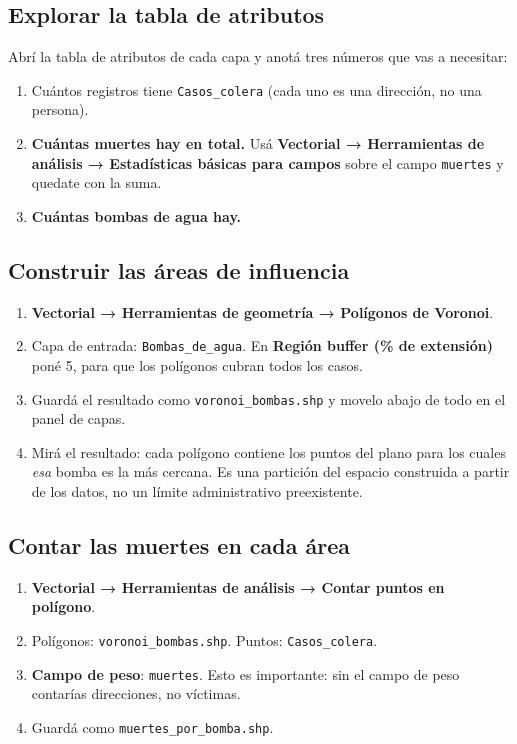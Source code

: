 \documentclass{article}
\begin{document}
\subsection{Explorar la tabla de atributos}

Abrí la tabla de atributos de cada capa y anotá tres números que vas a necesitar:

\begin{enumerate}
    \item Cuántos registros tiene \texttt{Casos\_colera} (cada uno es una dirección, no una persona).
    \item \textbf{Cuántas muertes hay en total.} Usá \textbf{Vectorial → Herramientas de análisis → Estadísticas básicas para campos} sobre el campo \texttt{muertes} y quedate con la suma.
    \item \textbf{Cuántas bombas de agua hay.}
\end{enumerate}

\subsection{Construir las áreas de influencia}

\begin{enumerate}
    \item \textbf{Vectorial → Herramientas de geometría → Polígonos de Voronoi}.
    \item Capa de entrada: \texttt{Bombas\_de\_agua}. En \textbf{Región buffer (\% de extensión)} poné 5, para que los polígonos cubran todos los casos.
    \item Guardá el resultado como \texttt{voronoi\_bombas.shp} y movelo abajo de todo en el panel de capas.
    \item Mirá el resultado: cada polígono contiene los puntos del plano para los cuales \emph{esa} bomba es la más cercana. Es una partición del espacio construida a partir de los datos, no un límite administrativo preexistente.
\end{enumerate}

\subsection{Contar las muertes en cada área}

\begin{enumerate}
    \item \textbf{Vectorial → Herramientas de análisis → Contar puntos en polígono}.
    \item Polígonos: \texttt{voronoi\_bombas.shp}. Puntos: \texttt{Casos\_colera}.
    \item \textbf{Campo de peso}: \texttt{muertes}. Esto es importante: sin el campo de peso contarías direcciones, no víctimas.
    \item Guardá como \texttt{muertes\_por\_bomba.shp}.
\end{enumerate}
\end{document}
